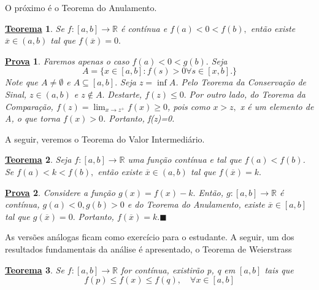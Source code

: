 \documentclass{article}
\newtheorem*{theorem*}{\underline{Teorema}}
\newtheorem*{proof*}{\underline{Prova}}
\renewcommand\qedsymbol{$\blacksquare$}
\begin{document}
 O pr\'oximo \'e o Teorema do Anulamento.
 \begin{theorem*}
   Se $f:[a,b]\rightarrow \mathbb{R}$ \'e cont\'inua e $f(a)<0<f(b),$ ent\~ao existe $\overline{x}\in(a, b)$ tal que $f(\overline{x}) =0.$
 \end{theorem*}
\begin{proof*}
  Faremos apenas o caso $f(a)<0<g(b).$ Seja 
    $$
    A = \{x\in[a,b]:f(s)>0 \forall s\in[x, b].\}
    $$
    Note que $A\neq\emptyset$ e $A\subseteq{[a, b]}.$ Seja $z =\inf{A}$. Pelo Teorema da Conserva\c c\~ao de Sinal,
    $z\in(a, b)$ e $z\not\in A.$ Destarte, $f(z)\leq{0}.$ Por outro lado, do Teorema da Compara\c c\~ao, $f(z)=
    \lim_{x\to z^{+}}f(x)\geq{0}$, pois como $x > z,$ x \'e um elemento de A, o que torna $f(x)>0$. Portanto, f(z)=0.
\end{proof*}
 A seguir, veremos o Teorema do Valor Intermedi\'ario.
\begin{theorem*}
  Seja $f:[a, b]\rightarrow \mathbb{R}$ uma fun\c c\~ao cont\'inua e tal que  $f(a)<f(b)$. Se $f(a)<k<f(b),$
  ent\~ao existe $\overline{x}\in(a, b)$ tal que $f(\overline{x})=k.$
\end{theorem*}
\begin{proof*}
  Considere a fun\c c\~ao $g(x)=f(x)-k.$ Ent\~ao, $g:[a, b]\rightarrow \mathbb{R}$ \'e cont\'inua, $g(a)<0, g(b)>0$
  e do Teorema do Anulamento, existe $\overline{x}\in[a, b]$ tal que $g(\overline{x})=0.$ Portanto, $f(\overline{x})=k.$\qedsymbol
\end{proof*}
As vers\~oes an\'alogas ficam como exerc\'icio para o estudante.
A seguir, um dos resultados fundamentais da an\'alise \'e apresentado, o Teorema de Weierstrass
\begin{theorem*}
  Se $f:[a, b]\rightarrow \mathbb{R}$ for cont\'inua, existir\~ao p, q em $[a, b]$ tais que 
    $$
    f(p)\leq f(x)\leq f(q),\quad \forall x\in[a,b]
    $$
\end{theorem*}
\end{document}
